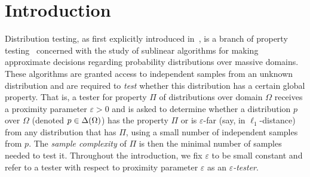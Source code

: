 \documentclass[11pt]{article}
\theoremstyle{remark}   	\newtheorem{remark}[theorem]{Remark}
\theoremstyle{definition}   	\newaliascnt{defn}{theorem}
\newcommand{\eps}{\ensuremath{\varepsilon}\xspace}
\newcommand{\lp}[1][1]{\ell_{#1}}
\begin{document}
\clearpage{}

\section{Introduction}\label{sec:intro}
Distribution testing, as first explicitly introduced in~\cite{BFRSW:00}, is a branch of property testing~\cite{RS:96,GGR:98} concerned with the study of sublinear algorithms for making approximate decisions regarding probability distributions over massive domains. These algorithms are granted access to independent samples from an unknown distribution and are required to \emph{test} whether this distribution has a certain global property. That is, a tester for property $\Pi$ of distributions over domain $\Omega$ receives a proximity parameter $\eps>0$ and is asked to determine whether a distribution $p$ over $\Omega$ (denoted $p\in\Delta\!\left(\Omega\right)$) has the property $\Pi$ or is $\eps$-far (say, in $\lp[1]$-distance) from any distribution that has $\Pi$, using a small number of independent samples from $p$. The \emph{sample complexity} of $\Pi$ is then the minimal number of samples needed to test it. Throughout the introduction, we fix $\eps$ to be small constant and refer to a tester with respect to proximity parameter $\eps$ as an \emph{$\eps$-tester}.
\end{document}
